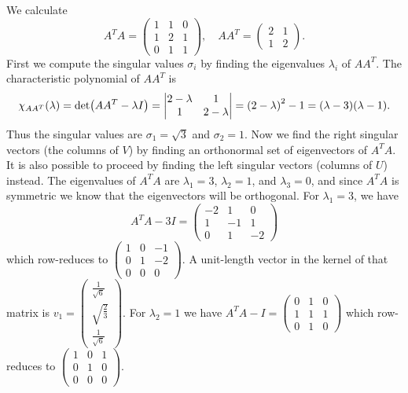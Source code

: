 \documentclass{exercise}
\begin{document}
	We calculate
	\[
		A^T A = \begin{pmatrix}
			1 & 1 & 0\\
			1 & 2 & 1\\
			0 & 1 & 1
		\end{pmatrix}, \quad AA^T = \begin{pmatrix}
			2 & 1\\
			1 & 2
		\end{pmatrix}.
	\]
	First we compute the singular values \(\sigma_i\) by finding the eigenvalues \(\lambda_i\) of \(AA^T\).
	The characteristic polynomial of \(AA^T\) is
	\[
		\chi_{AA^T}\parentheses*{\lambda} = \det\parentheses*{AA^T - \lambda I} = \begin{vmatrix}
			2 - \lambda & 1\\
			1 & 2 - \lambda
		\end{vmatrix} = \parentheses*{2 - \lambda}^2 - 1 = \parentheses*{\lambda - 3}\parentheses*{\lambda - 1}.
	\]
	Thus the singular values are \(\sigma_1 = \sqrt{3}\) and \(\sigma_2 = 1\).
	Now we find the right singular vectors (the columns of \(V\)) by finding an orthonormal set of eigenvectors of \(A^T A\).
	It is also possible to proceed by finding the left singular vectors (columns of \(U\)) instead.
	The eigenvalues of \(A^T A\) are \(\lambda_1 = 3\), \(\lambda_2 = 1\), and \(\lambda_3 = 0\), and since \(A^T A\) is symmetric we know that the eigenvectors will be orthogonal.
	For \(\lambda_1 = 3\), we have
	\[
		A^T A - 3I = \begin{pmatrix}
			-2 & 1 & 0\\
			1 & -1 & 1\\
			0 & 1 & -2
		\end{pmatrix}
	\]
	which row-reduces to \(\begin{pmatrix}
		1 & 0 & -1\\
		0 & 1 & -2\\
		0 & 0 & 0
	\end{pmatrix}\).
	A unit-length vector in the kernel of that matrix is \(v_1 = \begin{pmatrix}
		\frac{1}{\sqrt{6}}\\
		\sqrt{\frac{2}{3}}\\
		\frac{1}{\sqrt{6}}
	\end{pmatrix}\).
	For \(\lambda_2 = 1\) we have \(A^T A - I = \begin{pmatrix}
		0 & 1 & 0\\
		1 & 1 & 1\\
		0 & 1 & 0
	\end{pmatrix}\) which row-reduces to \(\begin{pmatrix}
		1 & 0 & 1\\
		0 & 1 & 0\\
		0 & 0 & 0
	\end{pmatrix}\).
\end{document}
